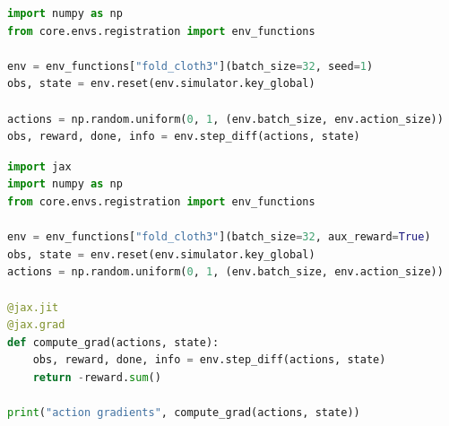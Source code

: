 

\lstset{style=mystyle}

\begin{lstlisting}[language=Python, caption=Example of Running Cloth Environment]
import numpy as np
from core.envs.registration import env_functions

env = env_functions["fold_cloth3"](batch_size=32, seed=1)
obs, state = env.reset(env.simulator.key_global)

actions = np.random.uniform(0, 1, (env.batch_size, env.action_size))
obs, reward, done, info = env.step_diff(actions, state)
\end{lstlisting}

\begin{lstlisting}[language=Python, caption=Example of Computing Action Gradients via \simulator]
import jax
import numpy as np
from core.envs.registration import env_functions

env = env_functions["fold_cloth3"](batch_size=32, aux_reward=True)
obs, state = env.reset(env.simulator.key_global)
actions = np.random.uniform(0, 1, (env.batch_size, env.action_size))

@jax.jit
@jax.grad
def compute_grad(actions, state):
    obs, reward, done, info = env.step_diff(actions, state)
    return -reward.sum()

print("action gradients", compute_grad(actions, state))
\end{lstlisting}

